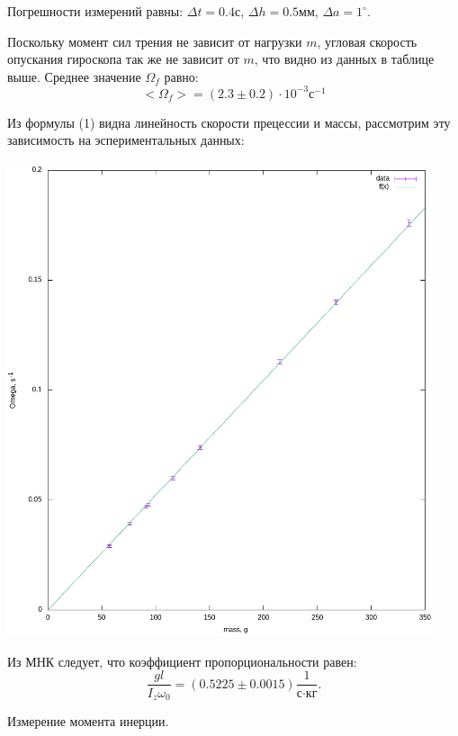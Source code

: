 \documentclass[a4paper,12pt]{article}
\begin{document}
Погрешности измерений равны: $\Delta t = 0.4 \text{с}$, $\Delta h = 0.5 \text{мм}$, $\Delta a = 1^\circ$. 

Поскольку момент сил трения не зависит от нагрузки $m$, угловая скорость опускания гироскопа так же не зависит от $m$, что видно из данных в таблице выше. Среднее значение $\Omega_f$ равно:
\begin{equation}
	< \Omega_f> = (2.3\pm 0.2)\cdot10^{-3}\text{с}^{-1}
\end{equation}

\newpage
Из формулы (1) видна линейность скорости прецессии и массы, рассмотрим эту зависимость на эспериментальных данных:
\begin{center}
	\includegraphics[width=0.95\textwidth]{plot0.png}
\end{center}

Из МНК следует, что коэффициент пропорциональности равен:
\begin{equation}
	\frac{gl}{I_z\omega_0} = (0.5225 \pm 0.0015) \frac{1}{\text{с} \cdot \text{кг}}.
\end{equation}

Измерение момента инерции.
\end{document}
